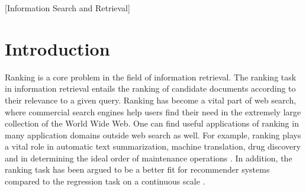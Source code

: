 \documentclass{sig-alternate-2013}
\begin{document}
\maketitle
\begin{abstract}
Learning to rank is an increasingly important scientific field that comprises the use of machine learning for the ranking task. Learning to rank methods are generally evaluated on benchmark test collections. However, comparison of learning to rank methods based on evaluation results is hindered by a non-existence of a \emph{de facto} standard set of evaluation benchmark collections. This paper proposes a way to compare learning to rank methods based on sparse evaluation results data on a set of benchmark datasets. The comparison methodology comprises of two components: 1) Normalized Winning Number, which gives insight on the ranking accuracy of the learning to rank method, and 2) Ideal Winning Number, which gives insight in the degree of certainty concerning the performance of the ranking accuracy. Evaluation results on the LETOR 2.0, LETOR 3.0, Yahoo! Learning to Rank Challenge, Yandex Internet Mathematics 2009 contest, MSLR-web10/30k, WCL2R and AOL datasets are collected through a structured literature search. ListNet, SmoothRank, FenchelRank, FSMRank, LRUF and LARF turned out to be the best performing learning to rank methods in increasing order of Normalized Winning Number and decreasing order of Ideal Winning Number.
\end{abstract}

[Information Search and Retrieval]


\section{Introduction}
Ranking is a core problem in the field of information retrieval. The ranking task in information retrieval entails the ranking of candidate documents according to their relevance to a given query. Ranking has become a vital part of web search, where commercial search engines help users find their need in the extremely large collection of the World Wide Web. One can find useful applications of ranking in many application domains outside web search as well. For example, ranking plays a vital role in automatic text summarization, machine translation, drug discovery and in determining the ideal order of maintenance operations \cite{Rudin2009}. In addition, the ranking task has been argued to be a better fit for recommender systems compared to the regression task on a continuous scale \cite{Adomavicius2005,McNee2006}.\\
\end{document}
